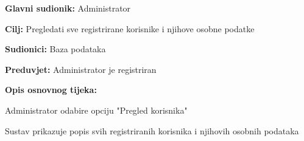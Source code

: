 					\noindent {}
					\begin{packed_item}
						
						\item \textbf{Glavni sudionik:} Administrator
						\item \textbf{Cilj:} Pregledati sve registrirane korisnike i njihove osobne podatke
						\item \textbf{Sudionici:} Baza podataka
						\item \textbf{Preduvjet:} Administrator je registriran
						\item \textbf{Opis osnovnog tijeka:}
						
						\item[] \begin{packed_enum}
							
							\item Administrator odabire opciju "Pregled korisnika" 
							\item Sustav prikazuje popis svih registriranih korisnika i njihovih osobnih podataka
						\end{packed_enum}
					\end{packed_item}
					
